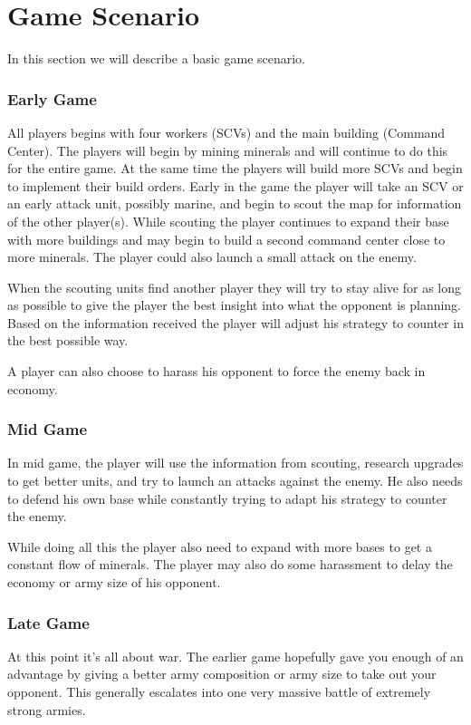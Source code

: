 \section{Game Scenario}
	In this section we will describe a basic game scenario.
	
	\subsubsection{Early Game}
		All players begins with four workers (SCVs) and the main building (Command Center). The players will begin by mining minerals and will continue to do this for the entire game. At the same time the players will build more SCVs and begin to implement their build orders. Early in the game the player will take an SCV or an early attack unit, possibly marine, and begin to scout the map for information of the other player(s). 
		While scouting the player continues to expand their base with more buildings and may begin to build a second command center close to more minerals. The player could also launch a small attack on the enemy.
		
		When the scouting units find another player they will try to stay alive for as long as possible to give the player the best insight into what the opponent is planning. Based on the information received the player will adjust his strategy to counter in the best possible way.
		
		A player can also choose to harass his opponent to force the enemy back in economy.
		
	\subsubsection{Mid Game}
		In mid game, the player will use the information from scouting, research upgrades to get better units, and try to launch an attacks against the enemy. He also needs to defend his own base while constantly trying to adapt his strategy to counter the enemy.
		
		While doing all this the player also need to expand with more bases to get a constant flow of minerals. The player may also do some harassment to delay the economy or army size of his opponent.
		
	\subsubsection{Late Game}
		At this point it's all about war. The earlier game hopefully gave you enough of an advantage by giving a better army composition or army size to take out your opponent. This generally escalates into one very massive battle of extremely strong armies.